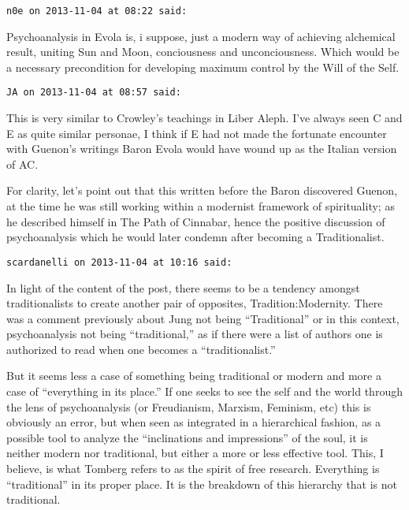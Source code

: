 \begin{footnotesize}\begin{sffamily}



\texttt{n0e on 2013-11-04 at 08:22 said: }

Psychoanalysis in Evola is, i suppose, just a modern way of achieving alchemical result, uniting Sun and Moon, conciousness and unconciousness. Which would be a necessary precondition for developing maximum control by the Will of the Self.


\hfill

\texttt{JA on 2013-11-04 at 08:57 said: }

This is very similar to Crowley's teachings in Liber Aleph. I've always seen C and E as quite similar personae, I think if E had not made the fortunate encounter with Guenon's writings Baron Evola would have wound up as the Italian version of AC. 

For clarity, let's point out that this written before the Baron discovered Guenon, at the time he was still working within a modernist framework of spirituality; as he described himself in The Path of Cinnabar, hence the positive discussion of psychoanalysis which he would later condemn after becoming a Traditionalist.


\hfill

\texttt{scardanelli on 2013-11-04 at 10:16 said: }

In light of the content of the post, there seems to be a tendency amongst traditionalists to create another pair of opposites, Tradition:Modernity. There was a comment previously about Jung not being “Traditional” or in this context, psychoanalysis not being “traditional,” as if there were a list of authors one is authorized to read when one becomes a “traditionalist.” 

But it seems less a case of something being traditional or modern and more a case of “everything in its place.” If one seeks to see the self and the world through the lens of psychoanalysis (or Freudianism, Marxism, Feminism, etc) this is obviously an error, but when seen as integrated in a hierarchical fashion, as a possible tool to analyze the “inclinations and impressions” of the soul, it is neither modern nor traditional, but either a more or less effective tool. This, I believe, is what Tomberg refers to as the spirit of free research. Everything is “traditional” in its proper place. It is the breakdown of this hierarchy that is not traditional.


\end{sffamily}
\end{footnotesize}
